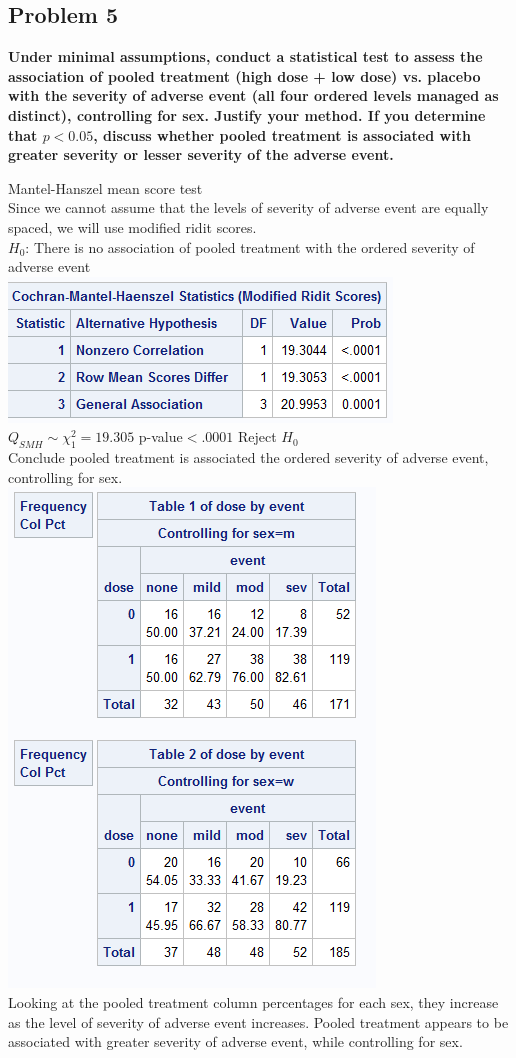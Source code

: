 \documentclass{article}
\begin{document}
\begin{flushleft}
\section*{Problem 5}
\textbf{Under minimal assumptions, conduct a statistical test to assess the association of pooled treatment
(high dose + low dose) vs. placebo with the severity of adverse event (all four ordered levels managed
as distinct), controlling for sex. Justify your method. If you determine that $p < 0.05$, discuss whether
pooled treatment is associated with greater severity or lesser severity of the adverse event.}\medbreak

Mantel-Hanszel mean score test\\
Since we cannot assume that the levels of severity of adverse event are equally spaced, we will use modified ridit scores.\\
$H_0$: There is no association of pooled treatment with the ordered severity of adverse event\\
\includegraphics[scale=.6]{modrit.png}\\
$Q_{SMH}\sim \chi^2_1=19.305$ p-value$<.0001$ Reject $H_0$\\
Conclude pooled treatment is associated the ordered severity of adverse event, controlling for sex.\\
\includegraphics[scale=.6]{tab.png}\\
Looking at the pooled treatment column percentages for each sex, they increase as the level of severity of adverse event increases. Pooled treatment appears to be associated with greater severity of adverse event, while controlling for sex.
\pagebreak

\end{flushleft}
\end{document}
